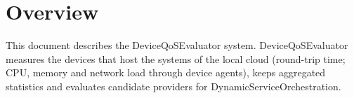 \documentclass[a4paper]{arrowhead}
\begin{document}
\sloppy

\ArrowheadSetup

\begin{center}
  \vspace*{1cm}
  \huge{\arrowtitle}

  \vspace*{0.2cm}
  \LARGE{\arrowtype}
  \vspace*{1cm}

  \vspace*{\fill}


  \vspace*{1cm}
  \vspace*{\fill}

  \begin{abstract}
    This document describes the DeviceQoSEvaluator support system of the Eclipse Arrowhead 5.2.2 framework, as implemented in \texttt{ah5-DeviceQoSEvaluator-java-spring} of the primary Java source tree (\texttt{Eclipse-Arrowhead-java}) and deployed with the standalone Compose definition of that folder.
  \end{abstract}

  \vspace*{1cm}
\end{center}

\newpage

\tableofcontents
\newpage

\section{Overview}
\label{sec:overview}

This document describes the DeviceQoSEvaluator system. Device\allowbreak{}Qo\allowbreak{}SEvaluator measures the devices that host the systems of the local cloud (round-trip time; CPU, memory and network load through device agents), keeps aggregated statistics and evaluates candidate providers for Dynamic\allowbreak{}Service\allowbreak{}Orchestration.
\end{document}
